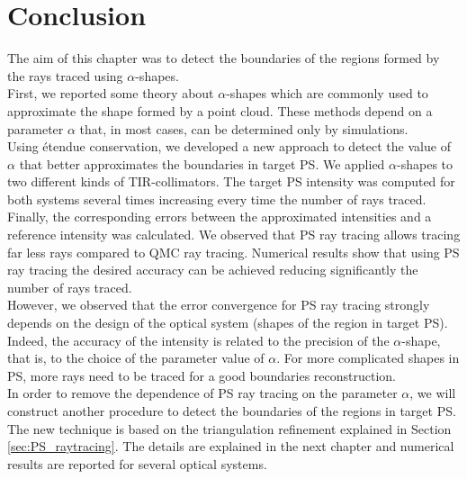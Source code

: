 \section{Conclusion}
The aim of this chapter was to detect the boundaries of the regions formed by the rays traced using $\alpha$-shapes.\\
\indent First, we reported some theory about $\alpha$-shapes which are commonly used to approximate the shape formed by a point cloud. 
These methods depend on a parameter $\alpha$ that, in most cases, can be determined only by simulations. 
\\ \indent Using \'{e}tendue conservation, we developed a new approach to detect the value of $\alpha$ that better approximates the boundaries in target PS. 
We applied $\alpha$-shapes to two different kinds of TIR-collimators. The target PS intensity was computed for both systems several times increasing every time the number of rays traced. Finally, the corresponding errors between the approximated intensities and a reference intensity was calculated. We observed that PS ray tracing allows tracing far less rays compared to QMC ray tracing. Numerical results show that using PS ray tracing the desired accuracy can be achieved reducing significantly the number of rays traced.\\ \indent 
However, we observed that the error convergence for PS ray tracing strongly depends on the design of the optical system (shapes of the region in target PS). Indeed, the accuracy of the intensity is related to the precision of the $\alpha$-shape, that is, to the choice of the parameter value of $\alpha$. For more complicated shapes in PS, more rays need to be traced for a good boundaries reconstruction.\\ \indent
In order to remove the dependence of PS ray tracing on the parameter $\alpha$, we will construct another procedure to detect the boundaries of the regions in target PS. 
The new technique is based on the triangulation refinement explained in Section \ref{sec:PS_raytracing}. The details are explained in the next chapter and numerical results are reported for several optical systems. 











































